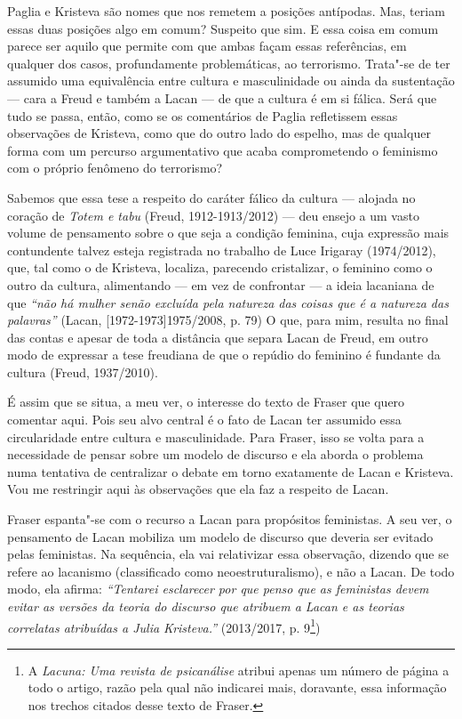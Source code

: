 Paglia e Kristeva são nomes que nos remetem a posições antípodas. Mas,
teriam essas duas posições algo em comum? Suspeito que sim. E essa coisa
em comum parece ser aquilo que permite com que ambas façam essas
referências, em qualquer dos casos, profundamente problemáticas, ao
terrorismo. Trata"-se de ter assumido uma equivalência entre cultura e
masculinidade ou ainda da sustentação --- cara a Freud e também a Lacan
--- de que a cultura é em si fálica. Será que tudo se passa, então, como
se os comentários de Paglia refletissem essas observações de Kristeva,
como que do outro lado do espelho, mas de qualquer forma com um percurso
argumentativo que acaba comprometendo o feminismo com o próprio fenômeno
do terrorismo?

Sabemos que essa tese a respeito do caráter fálico da cultura --- alojada
no coração de \emph{Totem e tabu} (Freud, 1912-1913/2012) --- deu ensejo
a um vasto volume de pensamento sobre o que seja a condição feminina,
cuja expressão mais contundente talvez esteja registrada no trabalho de
Luce Irigaray (1974/2012), que, tal como o de Kristeva, localiza,
parecendo cristalizar, o feminino como o outro da cultura, alimentando
--- em vez de confrontar --- a ideia lacaniana de que \emph{``não há
mulher senão excluída pela natureza das coisas que é a natureza das
palavras''} (Lacan, {[}1972-1973{]}1975/2008, p. 79) O que, para mim,
resulta no final das contas e apesar de toda a distância que separa
Lacan de Freud, em outro modo de expressar a tese freudiana de que o
repúdio do feminino é fundante da cultura (Freud, 1937/2010).

É assim que se situa, a meu ver, o interesse do texto de Fraser que
quero comentar aqui. Pois seu alvo central é o fato de Lacan ter
assumido essa circularidade entre cultura e masculinidade. Para Fraser,
isso se volta para a necessidade de pensar sobre um modelo de discurso e
ela aborda o problema numa tentativa de centralizar o debate em torno
exatamente de Lacan e Kristeva. Vou me restringir aqui às observações
que ela faz a respeito de Lacan.

Fraser espanta"-se com o recurso a Lacan para propósitos feministas. A
seu ver, o pensamento de Lacan mobiliza um modelo de discurso que
deveria ser evitado pelas feministas. Na sequência, ela vai relativizar
essa observação, dizendo que se refere ao lacanismo (classificado como
neoestruturalismo), e não a Lacan. De todo modo, ela afirma:
\emph{``Tentarei esclarecer por que penso que as feministas devem evitar
as versões da teoria do discurso que atribuem a Lacan e as teorias
correlatas atribuídas a Julia Kristeva.''} (2013/2017, p. 9\footnote{A
  \emph{Lacuna: Uma revista de psicanálise} atribui apenas um número de
  página a todo o artigo, razão pela qual não indicarei mais, doravante,
  essa informação nos trechos citados desse texto de Fraser.})

